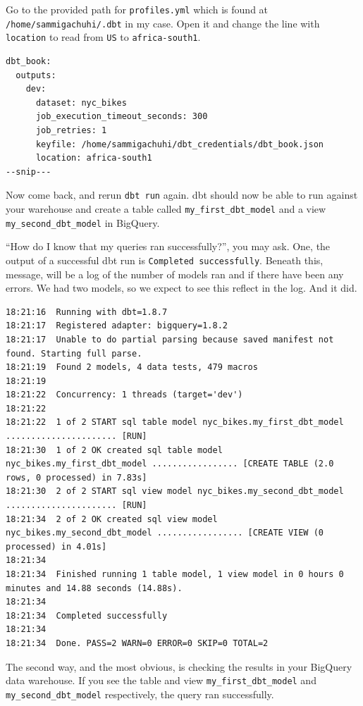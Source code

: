 \documentclass[
]{book}
\begin{document}
Go to the provided path for \texttt{profiles.yml} which is found at \texttt{/home/sammigachuhi/.dbt} in my case. Open it and change the line with \texttt{location} to read from \texttt{US} to \texttt{africa-south1}.

\begin{verbatim}
dbt_book:
  outputs:
    dev:
      dataset: nyc_bikes
      job_execution_timeout_seconds: 300
      job_retries: 1
      keyfile: /home/sammigachuhi/dbt_credentials/dbt_book.json
      location: africa-south1 
--snip---
\end{verbatim}

Now come back, and rerun \texttt{dbt\ run} again. dbt should now be able to run against your warehouse and create a table called \texttt{my\_first\_dbt\_model} and a view \texttt{my\_second\_dbt\_model} in BigQuery.

``How do I know that my queries ran successfully?'', you may ask. One, the output of a successful dbt run is \texttt{Completed\ successfully}. Beneath this, message, will be a log of the number of models ran and if there have been any errors. We had two models, so we expect to see this reflect in the log. And it did.

\begin{verbatim}
18:21:16  Running with dbt=1.8.7
18:21:17  Registered adapter: bigquery=1.8.2
18:21:17  Unable to do partial parsing because saved manifest not found. Starting full parse.
18:21:19  Found 2 models, 4 data tests, 479 macros
18:21:19  
18:21:22  Concurrency: 1 threads (target='dev')
18:21:22  
18:21:22  1 of 2 START sql table model nyc_bikes.my_first_dbt_model ...................... [RUN]
18:21:30  1 of 2 OK created sql table model nyc_bikes.my_first_dbt_model ................. [CREATE TABLE (2.0 rows, 0 processed) in 7.83s]
18:21:30  2 of 2 START sql view model nyc_bikes.my_second_dbt_model ...................... [RUN]
18:21:34  2 of 2 OK created sql view model nyc_bikes.my_second_dbt_model ................. [CREATE VIEW (0 processed) in 4.01s]
18:21:34  
18:21:34  Finished running 1 table model, 1 view model in 0 hours 0 minutes and 14.88 seconds (14.88s).
18:21:34  
18:21:34  Completed successfully
18:21:34  
18:21:34  Done. PASS=2 WARN=0 ERROR=0 SKIP=0 TOTAL=2
\end{verbatim}

The second way, and the most obvious, is checking the results in your BigQuery data warehouse. If you see the table and view \texttt{my\_first\_dbt\_model} and \texttt{my\_second\_dbt\_model} respectively, the query ran successfully.
\end{document}
